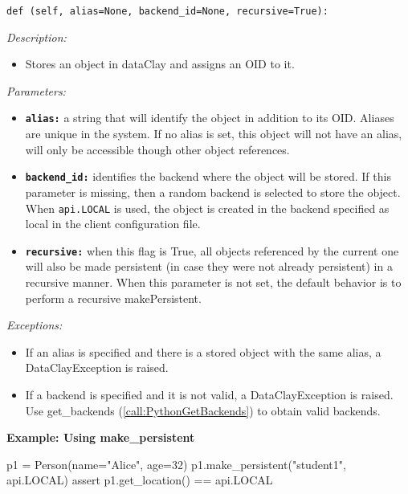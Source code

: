 \begin{dBox}
\label{sec:PythonObjectMakePersistent}
\texttt{def (self, alias=None, backend\_id=None, recursive=True):}
\LINE

{\it Description:}

\begin{itemize}
    \item Stores an object in dataClay and assigns an OID to it.
\end{itemize}

{\it Parameters:}

\begin{itemize}
    \item \texttt{\bfseries alias:} a string that will identify the object in addition to its OID. Aliases are unique in the system. If no alias is set, this object will not have an alias, will only be accessible though other object references.
    \item \texttt{\bfseries backend\_id:} identifies the backend where the object will be stored. If this parameter is missing, then a random backend is selected to store the object. When \texttt{api.LOCAL} is used, the object is created in the backend specified as local in the client configuration file.
    \item \texttt{\bfseries recursive:} when this flag is True, all objects referenced by the current one will also be made persistent (in case they were not already persistent) in a recursive manner. When this parameter is not set, the default behavior is to perform a recursive makePersistent.
\end{itemize}

{\it Exceptions:}

\begin{itemize}
    \item If an alias is specified and there is a stored object with the same alias, a DataClayException is raised.
    \item If a backend is specified and it is not valid, a DataClayException is raised. Use get\_backends (\ref{call:PythonGetBackends}) to obtain valid backends.
\end{itemize}

\end{dBox}

\begin{tBox}
\textcolor{basecolor} {\bf Example: Using make\_persistent}
\begin{python}
p1 = Person(name="Alice", age=32)
p1.make_persistent("student1", api.LOCAL)
assert p1.get_location() == api.LOCAL
\end{python}
\end{tBox}



